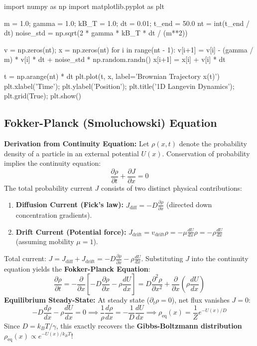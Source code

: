 \documentclass{article}
\begin{document}
\begin{jupytercode}
import numpy as np
import matplotlib.pyplot as plt

m = 1.0; gamma = 1.0; kB_T = 1.0; dt = 0.01; t_end = 50.0
nt = int(t_end / dt)
noise_std = np.sqrt(2 * gamma * kB_T * dt / (m**2))

v = np.zeros(nt); x = np.zeros(nt)
for i in range(nt - 1):
    v[i+1] = v[i] - (gamma / m) * v[i] * dt + noise_std * np.random.randn()
    x[i+1] = x[i] + v[i] * dt

t = np.arange(nt) * dt
plt.plot(t, x, label='Brownian Trajectory x(t)')
plt.xlabel('Time'); plt.ylabel('Position'); plt.title('1D Langevin Dynamics'); plt.grid(True); plt.show()
\end{jupytercode}
\newpage

\subsection{Fokker-Planck (Smoluchowski) Equation}
\textbf{Derivation from Continuity Equation:}
Let $\rho(x, t)$ denote the probability density of a particle in an external potential $U(x)$. Conservation of probability implies the continuity equation:
$$\frac{\partial \rho}{\partial t} + \frac{\partial J}{\partial x} = 0$$
The total probability current $J$ consists of two distinct physical contributions:
\begin{enumerate}
    \item \textbf{Diffusion Current (Fick's law):} $J_{\text{diff}} = -D \frac{\partial \rho}{\partial x}$ (directed down concentration gradients).
    \item \textbf{Drift Current (Potential force):} $J_{\text{drift}} = v_{\text{drift}} \rho = -\mu \frac{dU}{dx} \rho = -\rho \frac{dU}{dx}$ (assuming mobility $\mu = 1$).
\end{enumerate}
Total current: $J = J_{\text{diff}} + J_{\text{drift}} = -D \frac{\partial \rho}{\partial x} - \rho \frac{dU}{dx}$.
Substituting $J$ into the continuity equation yields the \textbf{Fokker-Planck Equation}:
$$\frac{\partial \rho}{\partial t} = -\frac{\partial}{\partial x} \left[ -D \frac{\partial \rho}{\partial x} - \rho \frac{dU}{dx} \right] = D \frac{\partial^2 \rho}{\partial x^2} + \frac{\partial}{\partial x} \left( \rho \frac{dU}{dx} \right)$$
\textbf{Equilibrium Steady-State:}
At steady state ($\partial_t \rho = 0$), net flux vanishes $J = 0$:
$$-D \frac{d\rho}{dx} - \rho \frac{dU}{dx} = 0 \implies \frac{1}{\rho}\frac{d\rho}{dx} = -\frac{1}{D}\frac{dU}{dx} \implies \rho_{\text{eq}}(x) = \frac{1}{Z} e^{-U(x)/D}$$
Since $D = k_B T / \gamma$, this exactly recovers the \textbf{Gibbs-Boltzmann distribution} $\rho_{\text{eq}}(x) \propto e^{-U(x)/k_B T}$!
\end{document}
